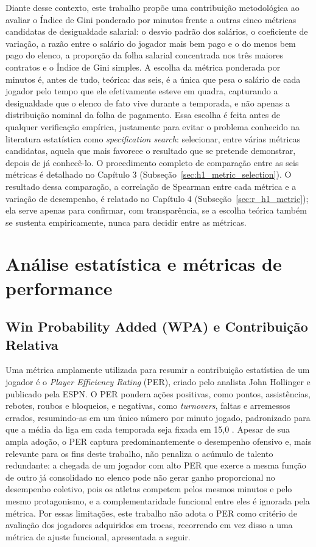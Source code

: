 Diante desse contexto, este trabalho propõe uma contribuição metodológica ao avaliar o Índice de Gini ponderado por minutos frente a outras cinco métricas candidatas de desigualdade salarial: o desvio padrão dos salários, o coeficiente de variação, a razão entre o salário do jogador mais bem pago e o do menos bem pago do elenco, a proporção da folha salarial concentrada nos três maiores contratos e o Índice de Gini simples. A escolha da métrica ponderada por minutos é, antes de tudo, teórica: das seis, é a única que pesa o salário de cada jogador pelo tempo que ele efetivamente esteve em quadra, capturando a desigualdade que o elenco de fato vive durante a temporada, e não apenas a distribuição nominal da folha de pagamento. Essa escolha é feita antes de qualquer verificação empírica, justamente para evitar o problema conhecido na literatura estatística como \textit{specification search}: selecionar, entre várias métricas candidatas, aquela que mais favorece o resultado que se pretende demonstrar, depois de já conhecê-lo. O procedimento completo de comparação entre as seis métricas é detalhado no Capítulo 3 (Subseção~\ref{sec:h1_metric_selection}). O resultado dessa comparação, a correlação de Spearman entre cada métrica e a variação de desempenho, é relatado no Capítulo 4 (Subseção~\ref{sec:r_h1_metric}); ela serve apenas para confirmar, com transparência, se a escolha teórica também se sustenta empiricamente, nunca para decidir entre as métricas.

\section{Análise estatística e métricas de performance}
\label{sec:stats_metrics}

\subsection{Win Probability Added (WPA) e Contribuição Relativa}
\label{sec:wpa_metric}

Uma métrica amplamente utilizada para resumir a contribuição estatística de um jogador é o \textit{Player Efficiency Rating} (PER), criado pelo analista John Hollinger e publicado pela ESPN. O PER pondera ações positivas, como pontos, assistências, rebotes, roubos e bloqueios, e negativas, como \textit{turnovers}, faltas e arremessos errados, resumindo-as em um único número por minuto jogado, padronizado para que a média da liga em cada temporada seja fixada em 15,0 \citep{hollinger2007}. Apesar de sua ampla adoção, o PER captura predominantemente o desempenho ofensivo e, mais relevante para os fins deste trabalho, não penaliza o acúmulo de talento redundante: a chegada de um jogador com alto PER que exerce a mesma função de outro já consolidado no elenco pode não gerar ganho proporcional no desempenho coletivo, pois os atletas competem pelos mesmos minutos e pelo mesmo protagonismo, e a complementaridade funcional entre eles é ignorada pela métrica. Por essas limitações, este trabalho não adota o PER como critério de avaliação dos jogadores adquiridos em trocas, recorrendo em vez disso a uma métrica de ajuste funcional, apresentada a seguir.

